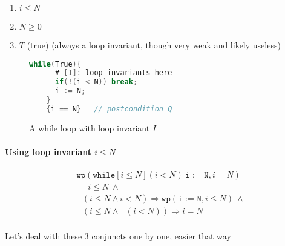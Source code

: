 \documentclass[oneside,11pt,dvipsnames]{book}
\renewcommand{\implies}{\Rightarrow}
\newcommand{\code}[1]{\texttt{#1}}
\begin{document}
 \begin{enumerate}
        \item $i \le N$
        \item $N \ge 0$
        \item $T$ (true) (always a loop invariant, though very weak and likely useless)
 \end{enumerate}


 \begin{figure}
    \begin{lstlisting}[language=C]
    while(True){
      # [I]: loop invariants here
      if(!(i < N)) break;
      i := N;
    }
    {i == N}   // postcondition Q
    \end{lstlisting} 
    \caption{A while loop with loop invariant $I$}\label{fig:while-loop}
    \end{figure}
    


\paragraph{Using loop invariant $i \le N$}

\begin{equation*}
    \begin{split}
        &\code{wp}(\code{while}[i \le N] (i < N ) ~\code{i := N}, i = N)\\
    &= i \le N ~\land  \\
    &~~~ (i \le N \land  i < N) \implies \code{wp}(\code{i := N}, i \le N) ~\land \\
    &~~~ (i \le N \land \neg(i < N))  \implies i = N\\ 
    \end{split}
\end{equation*}

Let's deal with these 3 conjuncts one by one, easier that way
\end{document}
